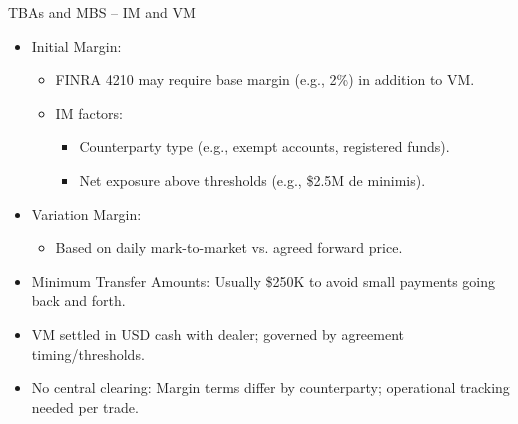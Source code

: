 \documentclass[handout, aspectratio=169]{beamer}
\begin{document}
\begin{frame}{TBAs and MBS – IM and VM}
  \begin{itemize}
    \item Initial Margin:
    \begin{itemize}
      \item FINRA 4210 may require base margin (e.g., 2\%) in addition to VM.  
      \item IM factors:
      \begin{itemize}
        \item Counterparty type (e.g., exempt accounts, registered funds).
        \item Net exposure above thresholds (e.g., \$2.5M de minimis).
      \end{itemize}
    \end{itemize}
    \item Variation Margin:
    \begin{itemize}
      \item Based on daily mark-to-market vs. agreed forward price.
    \end{itemize}
    \item Minimum Transfer Amounts: Usually \$250K to avoid small payments going back and forth.
    \item VM settled in USD cash with dealer; governed by agreement timing/thresholds.
    \item No central clearing: Margin terms differ by counterparty; operational tracking needed per trade.
  \end{itemize}
\end{frame}
  
\end{document}
